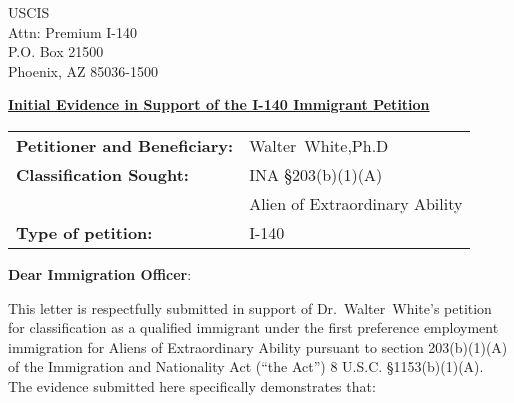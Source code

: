 \documentclass{article}
\newcommand{\fname}{Walter}
\newcommand{\lname}{White}
\newcommand{\fullname}{\fname~\lname}
\newcommand{\dr}{Dr.~\fname~\lname}
\newcommand{\drfn}{Dr.~\lname}
\newcommand{\oc}{Organic Chemistry}
\begin{document}
USCIS \\
Attn: Premium I-140 \\
P.O. Box 21500 \\
Phoenix, AZ 85036-1500




\underline{\textbf{Initial Evidence in Support of the I-140 Immigrant Petition}}

\begin{tabular}{ll}
    \textbf{Petitioner and Beneficiary:} & \fullname,Ph.D \\

    \textbf{Classification Sought:} & INA §203(b)(1)(A)\\
    & Alien of Extraordinary Ability\\
    \textbf{Type of petition:} & I-140 \\
\end{tabular}

\noindent\textbf{Dear Immigration Officer}:

This letter is respectfully submitted in support of \dr's
petition for classification as a qualified immigrant under
the first preference employment immigration for Aliens of
Extraordinary Ability pursuant to section 203(b)(1)(A)
of the Immigration and Nationality Act (“the Act”)  8 U.S.C. \S 1153(b)(1)(A).
%
The evidence submitted here specifically demonstrates that:
\end{document}
